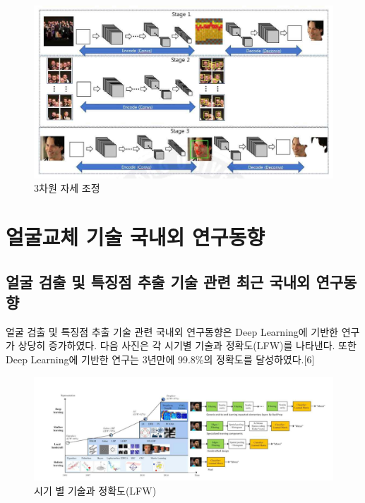 \documentclass{oblivoir}
\begin{document}
\begin{enumerate}
    \begin{figure}[h!]
        \centering
        \includegraphics{pic/chp1/img496}
        \caption{ 3차원 자세 조정\cite{reference4}}
    \end{figure}
\end{enumerate}

\section{얼굴교체 기술 국내외 연구동향}

\subsection{얼굴 검출 및 특징점 추출 기술 관련 최근 국내외 연구동향}

얼굴 검출 및 특징점 추출 기술 관련 국내외 연구동향은 Deep Learning에 기반한 연구가 상당히 증가하였다. 다음 사진은 각 시기별 기술과 정확도(LFW)를 나타낸다. 또한 Deep Learning에 기반한 연구는 3년만에 99.8\%의 정확도를 달성하였다.[6]


\begin{figure}[h!]
\centering
\includegraphics{pic/chp1/img497}
\caption{ 시기 별 기술과 정확도(LFW) \cite{reference6}}
\end{figure}
\end{document}
